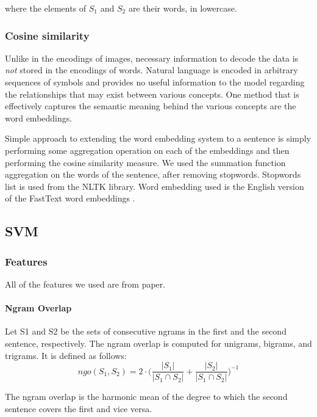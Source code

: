 \documentclass[10pt, a4paper]{article}
\begin{document}
where the elements of $S_1$ and $S_2$ are their words, in lowercase.

\subsubsection{Cosine similarity}

Unlike in the encodings of images, necessary information to decode the data is \textit{not} stored in the encodings of words.
Natural language is encoded in arbitrary sequences of symbols and provides no useful information to the model regarding the relationships that may exist between various concepts.
One method that is effectively captures the semantic meaning behind the various concepts are the word embeddings.

Simple approach to extending the word embedding system to a sentence is simply performing some aggregation operation on each of the embeddings and then performing the cosine similarity measure.
We used the summation function aggregation on the words of the sentence, after removing stopwords.
Stopwords list is used from the NLTK library.
Word embedding used is the English version of the FastText word embeddings \citep{joulin2016fasttext}.

\subsection{SVM}

\subsubsection{Features}
All of the features we used are from \citep{Saric2012TakeLabSF} paper.
\paragraph{Ngram Overlap \\}
Let S1 and S2 be the sets of consecutive ngrams in the first and the second sentence, respectively. The ngram overlap is computed for unigrams, bigrams, and trigrams. It is defined as follows:
\begin{equation}\label{eq:ngo}
ngo(S_1, S_2) = 2 \cdot \bigg( \frac{|S_1|}{|S_1 \cap S_2|}+\frac{|S_2|}{|S_1 \cap S_2|}\bigg)^{-1}
\end{equation}

The ngram overlap is the harmonic mean of the degree
to which the second sentence covers the first
and vice versa.\citep{Saric2012TakeLabSF}
\end{document}
